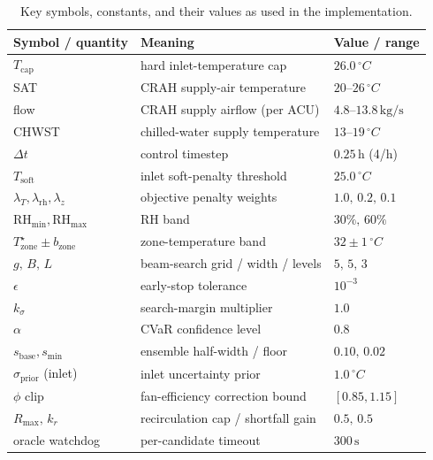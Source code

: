 \documentclass[11pt]{article}
\newcommand{\degC}{\ensuremath{^{\circ}}C}
\newcommand{\Tcap}{T_{\mathrm{cap}}}
\begin{document}
\begin{table}[H]
\centering
\caption{Key symbols, constants, and their values as used in the implementation.}
\label{tab:constants}
\small
\begin{tabular}{l l l}
\toprule
Symbol / quantity & Meaning & Value / range \\
\midrule
\(\Tcap\) & hard inlet-temperature cap & \(26.0\,\degC\) \\
SAT & CRAH supply-air temperature & \(20\)--\(26\,\degC\) \\
flow & CRAH supply airflow (per ACU) & \(4.8\)--\(13.8\,\mathrm{kg/s}\) \\
CHWST & chilled-water supply temperature & \(13\)--\(19\,\degC\) \\
\(\Delta t\) & control timestep & \(0.25\,\mathrm{h}\) (4/h) \\
\(T_{\mathrm{soft}}\) & inlet soft-penalty threshold & \(25.0\,\degC\) \\
\(\lambda_T,\lambda_{\mathrm{rh}},\lambda_z\) & objective penalty weights & \(1.0,\,0.2,\,0.1\) \\
\(\mathrm{RH}_{\min},\mathrm{RH}_{\max}\) & RH band & \(30\%,\,60\%\) \\
\(T^{\star}_{\mathrm{zone}}\pm b_{\mathrm{zone}}\) & zone-temperature band & \(32\pm1\,\degC\) \\
\(g,\,B,\,L\) & beam-search grid / width / levels & \(5,\,5,\,3\) \\
\(\epsilon\) & early-stop tolerance & \(10^{-3}\) \\
\(k_\sigma\) & search-margin multiplier & \(1.0\) \\
\(\alpha\) & CVaR confidence level & \(0.8\) \\
\(s_{\mathrm{base}},s_{\min}\) & ensemble half-width / floor & \(0.10,\,0.02\) \\
\(\sigma_{\mathrm{prior}}\) (inlet) & inlet uncertainty prior & \(1.0\,\degC\) \\
\(\phi\) clip & fan-efficiency correction bound & \([0.85,1.15]\) \\
\(R_{\max},\,k_r\) & recirculation cap / shortfall gain & \(0.5,\,0.5\) \\
oracle watchdog & per-candidate timeout & \(300\,\mathrm{s}\) \\
\bottomrule
\end{tabular}
\end{table}
\end{document}
